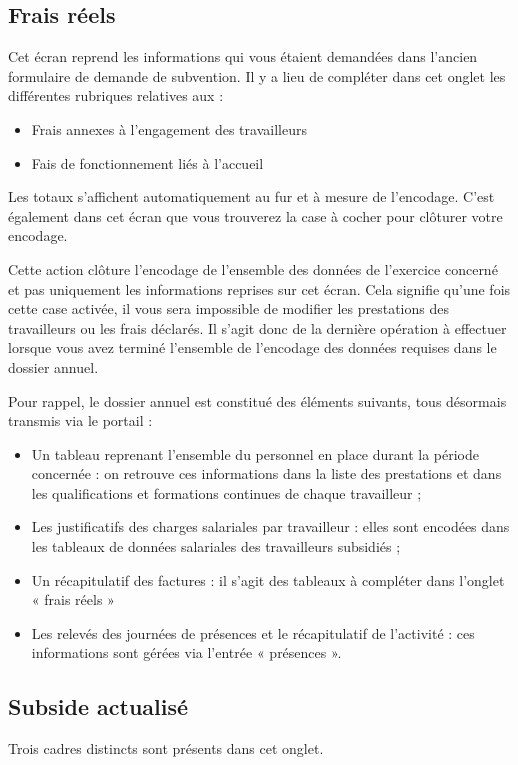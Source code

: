 \subsection{Frais réels}
Cet écran reprend les informations qui vous étaient demandées dans l’ancien formulaire de demande de subvention. Il y a lieu de compléter dans cet onglet les différentes rubriques relatives aux :
\begin{itemize}
    \item Frais annexes à l’engagement des travailleurs
    \item Fais de fonctionnement liés à l’accueil
\end{itemize}

Les totaux s’affichent automatiquement au fur et à mesure de l’encodage.
C’est également dans cet écran que vous trouverez la case à cocher pour clôturer votre encodage. 

\begin{attention} Cette action clôture l’encodage de l’ensemble des données de l’exercice concerné et pas uniquement les informations reprises sur cet écran. Cela signifie qu’une fois cette case activée, il vous sera impossible de modifier les prestations des travailleurs ou les frais déclarés. Il s’agit donc de la dernière opération à effectuer lorsque vous avez terminé l’ensemble de l’encodage des données requises dans le dossier annuel.
\end{attention}

Pour rappel, le dossier annuel est constitué des éléments suivants, tous désormais transmis via le portail : 
\begin{itemize}
    \item Un tableau reprenant l’ensemble du personnel en place durant la période concernée : on retrouve ces informations dans la liste des prestations et dans les qualifications et formations continues de chaque travailleur ;
    \item Les justificatifs des charges salariales par travailleur : elles sont encodées dans les tableaux de données salariales des travailleurs subsidiés ;
    \item Un récapitulatif des factures : il s’agit des tableaux à compléter dans l’onglet « frais réels »
    \item Les relevés des journées de présences et le récapitulatif de l’activité : ces informations sont gérées via l’entrée « présences ».
\end{itemize}

\subsection{Subside actualisé}
Trois cadres distincts sont présents dans cet onglet.

